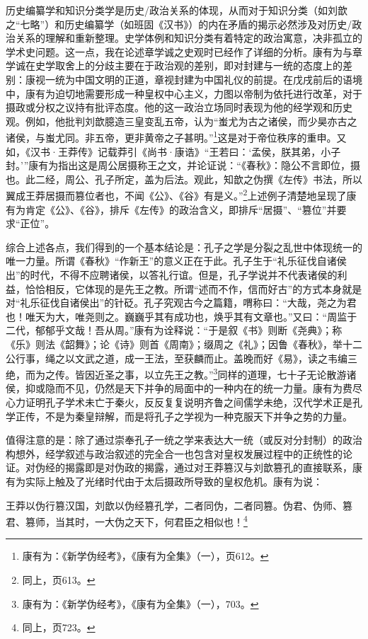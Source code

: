 \documentclass[a4paper, 12pt, openright]{ctexbook}
\renewenvironment{quote}
  {\list{}{\rightmargin2\ccwd \leftmargin2\ccwd \itemindent=2\ccwd \listparindent=2\ccwd}%
   \item\relax\small\kaishu\color{black}}
  {\endlist}
\begin{document}
历史编纂学和知识分类学是历史/政治关系的体现，从而对于知识分类（如刘歆之“七略”）和历史编纂学（如班固《汉书》）的内在矛盾的揭示必然涉及对历史/政治关系的理解和重新整理。史学体例和知识分类有着特定的政治寓意，决非孤立的学术史问题。这一点，我在论述章学诚之史观时已经作了详细的分析。康有为与章学诚在史学取舍上的分歧主要在于政治观的差别，即对封建与一统的态度上的差别：康视一统为中国文明的正道，章视封建为中国礼仪的前提。在戊戌前后的语境中，康有为迫切地需要形成一种皇权中心主义，力图以帝制为依托进行改革，对于摄政或分权之议持有批评态度。他的这一政治立场同时表现为他的经学观和历史观。例如，他批判刘歆臆造三皇变乱五帝，认为“蚩尤为古之诸侯，而少昊亦古之诸侯，与蚩尤同。非五帝，更非黄帝之子甚明。”\footnote{康有为：《新学伪经考》，《康有为全集》（一），页612。}这是对于帝位秩序的重申。又如，《汉书·王莽传》记载莽引《尚书·康诰》“王若曰：‘孟侯，朕其弟，小子封。’”康有为指出这是周公居摄称王之文，并论证说：“《春秋》：隐公不言即位，摄也。此二经，周公、孔子所定，盖为后法。观此，知歆之伪撰《左传》书法，所以翼成王莽居摄而篡位者也，不闻《公》、《谷》有是义。”\footnote{同上，页613。}上述例子清楚地呈现了康有为肯定《公》、《谷》，排斥《左传》的政治含义，即排斥“居摄”、“篡位”并要求“正位”。

综合上述各点，我们得到的一个基本结论是：孔子之学是分裂之乱世中体现统一的唯一力量。所谓《春秋》“作新王”的意义正在于此。孔子生于“礼乐征伐自诸侯出”的时代，不得不应聘诸侯，以答礼行谊。但是，孔子学说并不代表诸侯的利益，恰恰相反，它体现的是先王之教。所谓“述而不作，信而好古”的方式本身就是对“礼乐征伐自诸侯出”的针砭。孔子究观古今之篇籍，喟称曰：“大哉，尧之为君也！唯天为大，唯尧则之。巍巍乎其有成功也，焕乎其有文章也。”又曰：“周监于二代，郁郁乎文哉！吾从周。”康有为诠释说：“于是叙《书》则断《尧典》；称《乐》则法《韶舞》；论《诗》则首《周南》；缀周之《礼》；因鲁《春秋》，举十二公行事，绳之以文武之道，成一王法，至获麟而止。盖晚而好《易》，读之韦编三绝，而为之传。皆因近圣之事，以立先王之教。”\footnote{康有为：《新学伪经考》，《康有为全集》（一），703。}同样的道理，七十子无论散游诸侯，抑或隐而不见，仍然是天下并争的局面中的一种内在的统一力量。康有为费尽心力证明孔子学术未亡于秦火，反反复复说明齐鲁之间儒学未绝，汉代学术正是孔学正传，不是为秦皇辩解，而是将孔子之学视为一种克服天下并争之势的力量。

值得注意的是：除了通过崇奉孔子一统之学来表达大一统（或反对分封制）的政治构想外，经学叙述与政治叙述的完全合一也包含对皇权发展过程中的正统性的论证。对伪经的揭露即是对伪政的揭露，通过对王莽篡汉与刘歆篡孔的直接联系，康有为实际上触及了光绪时代由于太后摄政所导致的皇权危机。康有为说：

\begin{quote}
王莽以伪行篡汉国，刘歆以伪经篡孔学，二者同伪，二者同篡。伪君、伪师、篡君、篡师，当其时，一大伪之天下，何君臣之相似也！\footnote{同上，页723。}
\end{quote}
\end{document}
